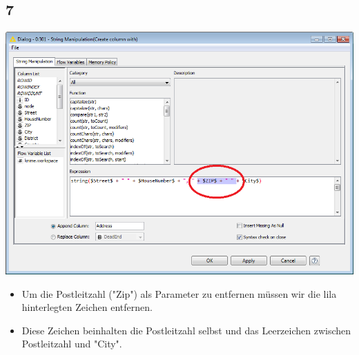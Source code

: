 \documentclass{beamer}
\begin{document}
\subsection{7}
\begin{frame}
	\begin{center}
  		\includegraphics[height=0.6\textheight]{7.png}
	\end{center}
	\begin{itemize}
		\item Um die Postleitzahl ("Zip") als Parameter zu entfernen müssen wir die lila hinterlegten Zeichen entfernen.
		\item Diese Zeichen beinhalten die Postleitzahl selbst und das Leerzeichen zwischen Postleitzahl und "City".
	\end{itemize}
\end{frame}
\end{document}
